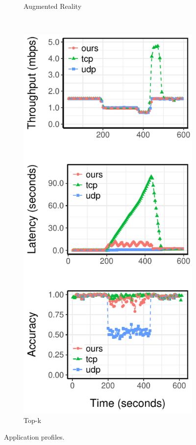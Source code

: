 \begin{figure}[!htb]
\begin{subfigure}[t]{0.33\textwidth}
    \caption{Augmented Reality}
    \label{fig:ar-runtime}
  \end{subfigure}
  ~
  \begin{subfigure}[t]{0.33\textwidth}
    \centering
    \includegraphics[width=\textwidth]{figures/topk-runtime-verticle.pdf}
    \caption{Top-k}
    \label{fig:tk-runtime}
  \end{subfigure}
  \caption{Application profiles.}
  \label{fig:all-runtime}
\end{figure}

